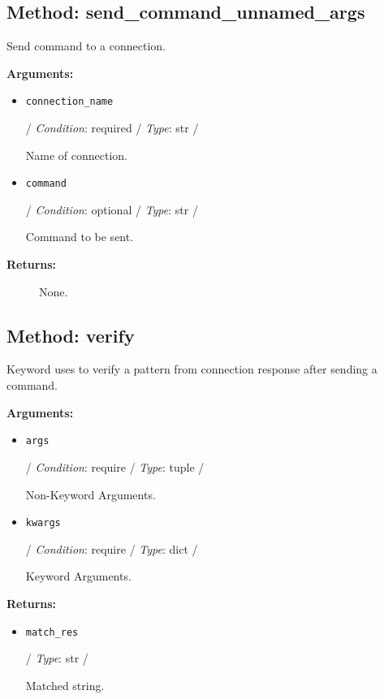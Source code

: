 \hypertarget{qconnectbase-connection-manager-method-send_command_unnamed_args-36}{%
\subsection{Method:
send\_command\_unnamed\_args}\label{qconnectbase-connection-manager-method-send_command_unnamed_args-36}}

Send command to a connection.

\textbf{Arguments:}

\begin{itemize}
\item
  \texttt{connection\_name}

  / \emph{Condition}: required / \emph{Type}: str /

  Name of connection.
\item
  \texttt{command}

  / \emph{Condition}: optional / \emph{Type}: str /

  Command to be sent.
\end{itemize}

\begin{description}
\item[\textbf{Returns:}]
None.
\end{description}

\hypertarget{qconnectbase-connection-manager-method-verify-37}{%
\subsection{Method: verify}\label{qconnectbase-connection-manager-method-verify-37}}

Keyword uses to verify a pattern from connection response after sending
a command.

\textbf{Arguments:}

\begin{itemize}
\item
  \texttt{args}

  / \emph{Condition}: require / \emph{Type}: tuple /

  Non-Keyword Arguments.
\item
  \texttt{kwargs}

  / \emph{Condition}: require / \emph{Type}: dict /

  Keyword Arguments.
\end{itemize}

\textbf{Returns:}

\begin{itemize}
\item
  \texttt{match\_res}

  / \emph{Type}: str /

  Matched string.
\end{itemize}

